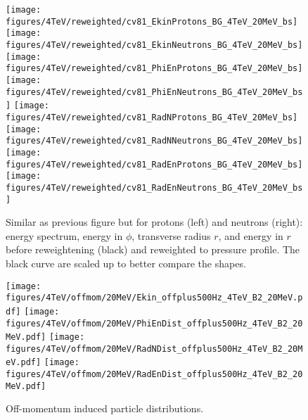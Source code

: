 \begin{figure}
\begin{center}
  \texttt{[image: figures/4TeV/reweighted/cv81\_EkinProtons\_BG\_4TeV\_20MeV\_bs]}
  \texttt{[image: figures/4TeV/reweighted/cv81\_EkinNeutrons\_BG\_4TeV\_20MeV\_bs]}
  \texttt{[image: figures/4TeV/reweighted/cv81\_PhiEnProtons\_BG\_4TeV\_20MeV\_bs]}
  \texttt{[image: figures/4TeV/reweighted/cv81\_PhiEnNeutrons\_BG\_4TeV\_20MeV\_bs]}
  \texttt{[image: figures/4TeV/reweighted/cv81\_RadNProtons\_BG\_4TeV\_20MeV\_bs]}
  \texttt{[image: figures/4TeV/reweighted/cv81\_RadNNeutrons\_BG\_4TeV\_20MeV\_bs]}
  \texttt{[image: figures/4TeV/reweighted/cv81\_RadEnProtons\_BG\_4TeV\_20MeV\_bs]}
  \texttt{[image: figures/4TeV/reweighted/cv81\_RadEnNeutrons\_BG\_4TeV\_20MeV\_bs]}
\end{center}
\vspace{-0.6cm}
 \caption{Similar as previous figure but for protons (left) and neutrons (right): energy spectrum, energy in $\phi$, transverse radius $r$, and energy in $r$ before reweightening (black) and reweighted to pressure profile. The black curve are scaled up to better compare the shapes. 
   \label{fig:cv81ProtNeut4TeV}}
\end{figure}



\begin{figure}
  \begin{center}
    \texttt{[image: figures/4TeV/offmom/20MeV/Ekin\_offplus500Hz\_4TeV\_B2\_20MeV.pdf]}
    \texttt{[image: figures/4TeV/offmom/20MeV/PhiEnDist\_offplus500Hz\_4TeV\_B2\_20MeV.pdf]}
  \texttt{[image: figures/4TeV/offmom/20MeV/RadNDist\_offplus500Hz\_4TeV\_B2\_20MeV.pdf]}
  \texttt{[image: figures/4TeV/offmom/20MeV/RadEnDist\_offplus500Hz\_4TeV\_B2\_20MeV.pdf]}

\end{center}
\vspace{-0.6cm}
 \caption{Off-momentum induced particle distributions.
  \label{offmom4TeV2}}
\end{figure}




